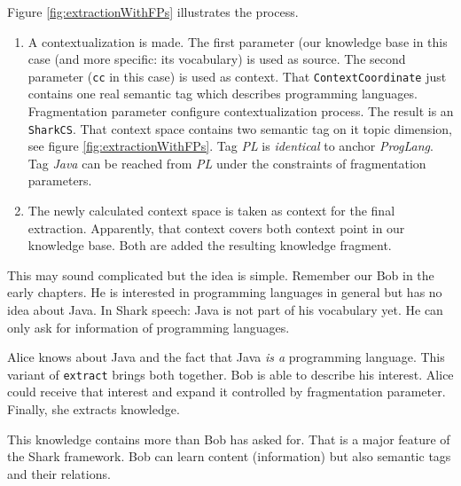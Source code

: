 Figure \ref{fig:extractionWithFPs} illustrates the process.

\begin{enumerate}
\item A contextualization is made. The first parameter (our knowledge base in this case (and more specific: its vocabulary) is used as source. The second parameter ({\tt cc} in this case) is used as context. That {\tt ContextCoordinate} just contains one real semantic tag which describes programming languages. Fragmentation parameter configure contextualization process. The result is an {\tt SharkCS}. That context space contains two semantic tag on it topic dimension, see figure \ref{fig:extractionWithFPs}. Tag {\it PL} is {\it identical} to anchor {\it ProgLang}. Tag {\it Java} can be reached from {\it PL} under the constraints of fragmentation parameters.

\item The newly calculated context space is taken as context for the final extraction. Apparently, that context covers both context point in our knowledge base. Both are added the resulting knowledge fragment.
\end{enumerate}

This may sound complicated but the idea is simple. Remember our Bob in the early chapters. He is interested in programming languages in general but has no idea about Java. In Shark speech: Java is not part of his vocabulary yet. He can only ask for information of programming languages.

Alice knows about Java and the fact that Java {\it is a} programming language. This variant of {\tt extract} brings both together. Bob is able to describe his interest. Alice could receive that interest and expand it controlled by fragmentation parameter. Finally, she extracts knowledge. 

This knowledge contains more than Bob has asked for. That is a major feature of the Shark framework. Bob can learn content (information) but also semantic tags and their relations.

